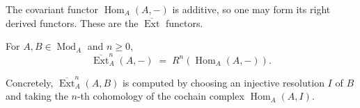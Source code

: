 The covariant functor $\operatorname{Hom}_A(A, -)$ is additive, so one may form its right derived functors. These are the $\overline{\operatorname{Ext}}$ functors.

For $A, B \in \operatorname{Mod}_A$ and $n \geq 0$,
$$
\overline{\operatorname{Ext}}_A^n(A, -) \;=\; R^n(\operatorname{Hom}_A(A, -)).
$$

Concretely, $\overline{\operatorname{Ext}}_A^n(A, B)$ is computed by choosing an injective resolution $I$ of $B$ and taking the $n$-th cohomology of the cochain complex $\operatorname{Hom}_A(A, I)$.
